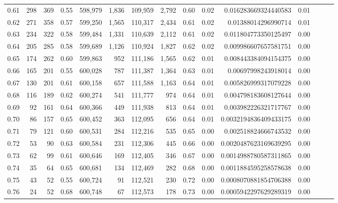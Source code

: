 \begin{tabular}{rrrrrrrrrrrrrrr}
0.61 &     298 &    369 &  0.55 &  598,979 &    1,836 &  109,959 &    2,792 &  0.60 &  0.02 &    0.016283669324440583 &      0.01 \\
0.62 &     271 &    358 &  0.57 &  599,250 &    1,565 &  110,317 &    2,434 &  0.61 &  0.02 &     0.01388014296990714 &      0.01 \\
0.63 &     234 &    322 &  0.58 &  599,484 &    1,331 &  110,639 &    2,112 &  0.61 &  0.02 &    0.011804773350125497 &      0.00 \\
0.64 &     205 &    285 &  0.58 &  599,689 &    1,126 &  110,924 &    1,827 &  0.62 &  0.02 &    0.009986607657581751 &      0.00 \\
0.65 &     174 &    262 &  0.60 &  599,863 &      952 &  111,186 &    1,565 &  0.62 &  0.01 &    0.008443384094154375 &      0.00 \\
0.66 &     165 &    201 &  0.55 &  600,028 &      787 &  111,387 &    1,364 &  0.63 &  0.01 &     0.00697998243918014 &      0.00 \\
0.67 &     130 &    201 &  0.61 &  600,158 &      657 &  111,588 &    1,163 &  0.64 &  0.01 &    0.005826999317079228 &      0.00 \\
0.68 &     116 &    189 &  0.62 &  600,274 &      541 &  111,777 &      974 &  0.64 &  0.01 &    0.004798183608127644 &      0.00 \\
0.69 &      92 &    161 &  0.64 &  600,366 &      449 &  111,938 &      813 &  0.64 &  0.01 &    0.003982226321717767 &      0.00 \\
0.70 &      86 &    157 &  0.65 &  600,452 &      363 &  112,095 &      656 &  0.64 &  0.01 &   0.0032194836409433175 &      0.00 \\
0.71 &      79 &    121 &  0.60 &  600,531 &      284 &  112,216 &      535 &  0.65 &  0.00 &    0.002518824666743532 &      0.00 \\
0.72 &      53 &     90 &  0.63 &  600,584 &      231 &  112,306 &      445 &  0.66 &  0.00 &   0.0020487623169639295 &      0.00 \\
0.73 &      62 &     99 &  0.61 &  600,646 &      169 &  112,405 &      346 &  0.67 &  0.00 &   0.0014988780587311865 &      0.00 \\
0.74 &      35 &     64 &  0.65 &  600,681 &      134 &  112,469 &      282 &  0.68 &  0.00 &   0.0011884595258578638 &      0.00 \\
0.75 &      43 &     52 &  0.55 &  600,724 &       91 &  112,521 &      230 &  0.72 &  0.00 &   0.0008070881854706388 &      0.00 \\
0.76 &      24 &     52 &  0.68 &  600,748 &       67 &  112,573 &      178 &  0.73 &  0.00 &   0.0005942297629289319 &      0.00 \\

\end{tabular}

